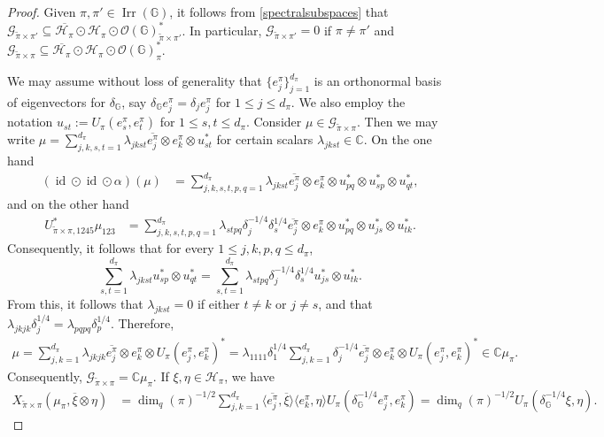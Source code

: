 \documentclass[reqno]{amsart}
\numberwithin{equation}{section}
\DeclareMathOperator{\id}{\mathrm{id}}
\DeclareMathOperator{\Irr}{\mathrm{Irr}}
\newcommand{\mcG}{\mathcal{G}}
\newcommand{\mcH}{\mathcal{H}}
\newcommand{\mcO}{\mathcal{O}}
\newcommand{\C}{\mathbb{C}}
\newcommand{\G}{\mathbb{G}}
\begin{document}
\begin{proof}  Given $\pi, \pi'\in \Irr(\G)$, it follows from \eqref{spectralsubspaces}  that
$\mcG_{\tilde{\pi}\times \pi'}\subseteq \overline{\mcH_{\pi}}\odot \mcH_\pi \odot \mcO(\G)_{\tilde{\pi}\times \pi'}^*$. In particular, $\mcG_{\tilde{\pi}\times \pi'}= 0$ if $\pi \ne \pi'$ and $\mcG_{\tilde{\pi}\times \pi}\subseteq \overline{\mcH_\pi}\odot \mcH_\pi \odot \mcO(\G)_\pi^*$. 

We may assume without loss of generality that $\{e_j^\pi\}_{j=1}^{d_\pi}$ is an orthonormal basis of eigenvectors for $\delta_\G$, say $\delta_\G e_j^\pi= \delta_j e_j^\pi$ for $1\le j \le d_\pi$. We also employ the notation $u_{st}:= U_\pi(e_s^\pi, e_t^\pi)$ for $1\le s,t \le d_\pi$. Consider $\mu\in  \mcG_{\tilde{\pi}\times \pi}$. Then we may write  $\mu = \sum_{j,k,s,t=1}^{d_\pi} \lambda_{jkst}\overline{e_j^\pi}\otimes e_k^\pi \otimes u_{st}^*$ for certain scalars $\lambda_{jkst}\in \C$. On the one hand
\begin{align*}
    (\id \odot \id \odot \alpha)(\mu)&= \sum_{j,k,s,t,p,q=1}^{d_\pi} \lambda_{jkst}\overline{e_j^\pi}\otimes e_k^\pi\otimes u_{pq}^*\otimes u_{sp}^*\otimes u_{qt}^*,
\end{align*}
and on the other hand
\begin{align*}U_{\tilde{\pi}\times \pi, 1245}^*\mu_{123}&= \sum_{j,k,s,t,p,q=1}^{d_\pi}  \lambda_{stpq} \delta_j^{-1/4}\delta_s^{1/4} \overline{e_j^\pi}\otimes e_k^\pi\otimes u_{pq}^* \otimes u_{js}^*\otimes u_{tk}^*. \end{align*}
Consequently, it follows that for every $1\le j,k,p,q\le d_\pi$, 
$$\sum_{s,t=1}^{d_\pi} \lambda_{jkst}  u_{sp}^*\otimes u_{qt}^* = \sum_{s,t=1}^{d_\pi} \lambda_{stpq} \delta_j^{-1/4}\delta_s^{1/4} u_{js}^*\otimes u_{tk}^*.$$
From this, it  follows that $\lambda_{jkst}=0$ if either $t\ne k$ or $j\ne s$, and that $\lambda_{jkjk}\delta_j^{1/4}= \lambda_{pqpq}\delta_p^{1/4}$. Therefore,
\begin{align*}
    \mu = \sum_{j,k=1}^{d_\pi} \lambda_{jkjk} \overline{e_j^\pi}\otimes e_k^\pi \otimes U_\pi(e_j^\pi, e_k^\pi)^*= \lambda_{1111}\delta_1^{1/4}\sum_{j,k=1}^{d_\pi} \delta_j^{-1/4} \overline{e_j^\pi}\otimes e_k^\pi \otimes U_\pi(e_j^\pi, e_k^\pi)^* \in \C \mu_\pi.
\end{align*}
Consequently, $\mcG_{\tilde{\pi}\times  \pi}= \C \mu_\pi$. If $\xi, \eta \in \mcH_\pi$, we have
\begin{align*}
    X_{\tilde{\pi}\times \pi}(\mu_\pi, \overline{\xi}\otimes \eta)&= \dim_q(\pi)^{-1/2}\sum_{j,k=1}^{d_\pi}\langle \overline{e_j^\pi}, \overline{\xi}\rangle \langle e_k^\pi, \eta\rangle U_{\pi}(\delta_\G^{-1/4}e_j^\pi, e_k^\pi)= \dim_q(\pi)^{-1/2} U_\pi(\delta_\G^{-1/4}\xi, \eta).

\end{align*}
\end{proof}
\end{document}
